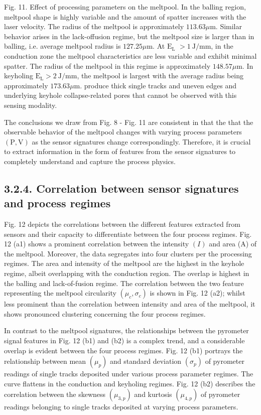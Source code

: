 \documentclass[10pt]{article}
\begin{document}
Fig. 11. Effect of processing parameters on the meltpool. In the balling region, meltpool shape is highly variable and the amount of spatter increases with the laser velocity. The radius of the meltpool is approximately $113.63 \mu \mathrm{m}$. Similar behavior arises in the lack-offusion regime, but the meltpool size is larger than in balling, i.e. average meltpool radius is $127.25 \mu \mathrm{m}$. At $\mathrm{E}_{\mathrm{L}}$ $>1 \mathrm{~J} / \mathrm{mm}$, in the conduction zone the meltpool characteristics are less variable and exhibit minimal spatter. The radius of the meltpool in this regime is approximately $148.57 \mu \mathrm{m}$. In keyholing $\mathrm{E}_{\mathrm{L}}>2 \mathrm{~J} / \mathrm{mm}$, the meltpool is largest with the average radius being approximately $173.63 \mu \mathrm{m}$. produce thick single tracks and uneven edges and underlying keyhole collapse-related pores that cannot be observed with this sensing modality.

The conclusions we draw from Fig. 8 - Fig. 11 are consistent in that the that the observable behavior of the meltpool changes with varying process parameters $(\mathrm{P}, \mathrm{V})$ as the sensor signatures change correspondingly. Therefore, it is crucial to extract information in the form of features from the sensor signatures to completely understand and capture the process physics.

\subsection*{3.2.4. Correlation between sensor signatures and process regimes}
Fig. 12 depicts the correlations between the different features extracted from sensors and their capacity to differentiate between the four process regimes. Fig. 12 (a1) shows a prominent correlation between the intensity $(I)$ and area (A) of the meltpool. Moreover, the data segregates into four clusters per the processing regimes. The area and intensity of the meltpool are the highest in the keyhole regime, albeit overlapping with the conduction region. The overlap is highest in the balling and lack-of-fusion regime. The correlation between the two feature representing the meltpool circularity $\left(\mu_{c}, \sigma_{c}\right)$ is shown in Fig. 12 (a2); whilst less prominent than the correlation between intensity and area of the meltpool, it shows pronounced clustering concerning the four process regimes.

In contrast to the meltpool signatures, the relationships between the pyrometer signal features in Fig. 12 (b1) and (b2) is a complex trend, and a considerable overlap is evident between the four process regimes. Fig. 12 (b1) portrays the relationship between mean $\left(\mu_{p}\right)$ and standard deviation $\left(\sigma_{p}\right)$ of pyrometer readings of single tracks deposited under various process parameter regimes. The curve flattens in the conduction and keyholing regimes. Fig. 12 (b2) describes the correlation between the skewness $\left(\mu_{3, p}\right)$ and kurtosis $\left(\mu_{4, p}\right)$ of pyrometer readings belonging to single tracks deposited at varying process parameters.
\end{document}
